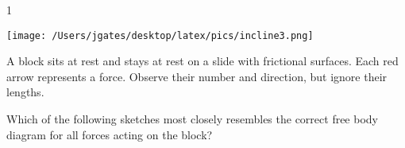 
\AddToShipoutPicture*{\BackgroundPic}

\addtocounter {ProbNum} {1}

\begin{floatingfigure}[r]{.3\textwidth}
\texttt{[image: /Users/jgates/desktop/latex/pics/incline3.png]}
\end{floatingfigure}
 
{\bf \Large{}} A block sits at rest and stays at rest on a slide with frictional surfaces. Each red arrow represents a force. Observe their number and direction, but ignore their lengths.  

 \bigskip

\indent Which of the following sketches most closely resembles the correct free body diagram for all forces acting on the block? 

\vfill

\newpage
